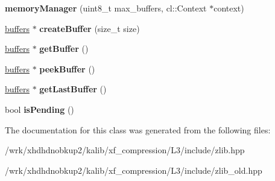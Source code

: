 \begin{DoxyCompactItemize}
\item 
\hypertarget{classxf_1_1compression_1_1memoryManager_a06244d0aae5734e40b545f9f1ce5b8ca}{{\bfseries memory\-Manager} (uint8\-\_\-t max\-\_\-buffers, cl\-::\-Context $\ast$context)}\label{classxf_1_1compression_1_1memoryManager_a06244d0aae5734e40b545f9f1ce5b8ca}

\item 
\hypertarget{classxf_1_1compression_1_1memoryManager_a41ec4b8844024a9681b5b2169d409498}{\hyperlink{structxf_1_1compression_1_1buffers}{buffers} $\ast$ {\bfseries create\-Buffer} (size\-\_\-t size)}\label{classxf_1_1compression_1_1memoryManager_a41ec4b8844024a9681b5b2169d409498}

\item 
\hypertarget{classxf_1_1compression_1_1memoryManager_aa556e1b841b4c2caf857dcca3cf61e2b}{\hyperlink{structxf_1_1compression_1_1buffers}{buffers} $\ast$ {\bfseries get\-Buffer} ()}\label{classxf_1_1compression_1_1memoryManager_aa556e1b841b4c2caf857dcca3cf61e2b}

\item 
\hypertarget{classxf_1_1compression_1_1memoryManager_ad6c764d30b210653e405ec3e1922ccdc}{\hyperlink{structxf_1_1compression_1_1buffers}{buffers} $\ast$ {\bfseries peek\-Buffer} ()}\label{classxf_1_1compression_1_1memoryManager_ad6c764d30b210653e405ec3e1922ccdc}

\item 
\hypertarget{classxf_1_1compression_1_1memoryManager_a4f063f42fc29f958f793b68e197afe59}{\hyperlink{structxf_1_1compression_1_1buffers}{buffers} $\ast$ {\bfseries get\-Last\-Buffer} ()}\label{classxf_1_1compression_1_1memoryManager_a4f063f42fc29f958f793b68e197afe59}

\item 
\hypertarget{classxf_1_1compression_1_1memoryManager_a5dc666affd08f2316ebb6bf5033c647d}{bool {\bfseries is\-Pending} ()}\label{classxf_1_1compression_1_1memoryManager_a5dc666affd08f2316ebb6bf5033c647d}

\end{DoxyCompactItemize}


The documentation for this class was generated from the following files\-:\begin{DoxyCompactItemize}
\item 
/wrk/xhdhdnobkup2/kalib/xf\-\_\-compression/\-L3/include/zlib.\-hpp\item 
/wrk/xhdhdnobkup2/kalib/xf\-\_\-compression/\-L3/include/zlib\-\_\-old.\-hpp\end{DoxyCompactItemize}
